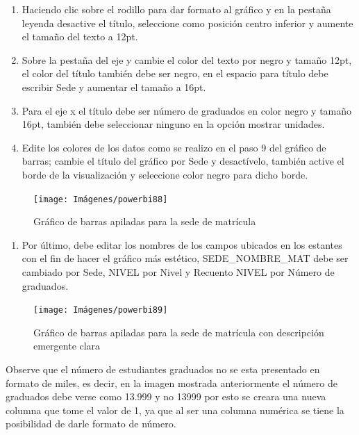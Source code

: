 \documentclass[
]{book}
\providecommand{\tightlist}{%
  \setlength{\itemsep}{0pt}\setlength{\parskip}{0pt}}
\begin{document}
\begin{enumerate}
\def\labelenumi{\arabic{enumi}.}
\setcounter{enumi}{3}
\item
  Haciendo clic sobre el rodillo para dar formato al gráfico y en la pestaña leyenda desactive el título, seleccione como posición centro inferior y aumente el tamaño del texto a 12pt.
\item
  Sobre la pestaña del eje y cambie el color del texto por negro y tamaño 12pt, el color del título también debe ser negro, en el espacio para título debe escribir Sede y aumentar el tamaño a 16pt.
\item
  Para el eje x el título debe ser número de graduados en color negro y tamaño 16pt, también debe seleccionar ninguno en la opción mostrar unidades.
\item
  Edite los colores de los datos como se realizo en el paso 9 del gráfico de barras; cambie el título del gráfico por Sede y desactívelo, también active el borde de la visualización y seleccione color negro para dicho borde.
\end{enumerate}

\begin{figure}

{\centering \texttt{[image: Imágenes/powerbi88]} 

}

\caption{Gráfico de barras apiladas para la sede de matrícula}\label{fig:paso7barrasapiladas-fig}
\end{figure}

\begin{enumerate}
\def\labelenumi{\arabic{enumi}.}
\setcounter{enumi}{7}
\tightlist
\item
  Por último, debe editar los nombres de los campos ubicados en los estantes con el fin de hacer el gráfico más estético, SEDE\_NOMBRE\_MAT debe ser cambiado por Sede, NIVEL por Nivel y Recuento NIVEL por Número de graduados.
\end{enumerate}

\begin{figure}

{\centering \texttt{[image: Imágenes/powerbi89]} 

}

\caption{Gráfico de barras apiladas para la sede de matrícula con descripción emergente clara}\label{fig:paso8barrasapiladas-fig}
\end{figure}

Observe que el número de estudiantes graduados no se esta presentado en formato de miles, es decir, en la imagen mostrada anteriormente el número de graduados debe verse como 13.999 y no 13999 por esto se creara una nueva columna que tome el valor de 1, ya que al ser una columna numérica se tiene la posibilidad de darle formato de número.
\end{document}
